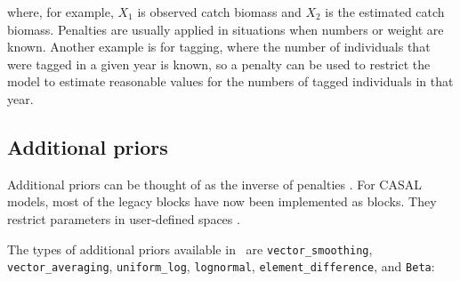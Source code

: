 where, for example, $X_1$ is observed catch biomass and $X_2$ is the estimated catch biomass. Penalties are usually applied in situations when numbers or weight are known. Another example is for tagging, where the number of individuals that were tagged in a given year is known, so a penalty can be used to restrict the model to estimate reasonable values for the numbers of tagged individuals in that year.

\subsection{Additional priors\label{sec:AdditionalPriors}}

Additional priors can be thought of as the inverse of penalties . For CASAL models, most of the legacy  blocks have now been implemented as  blocks. They restrict parameters in user-defined spaces .

The types of additional priors available in \CNAME\ are \texttt{vector\_smoothing}, \texttt{vector\_averaging}, \texttt{uniform\_log}, \texttt{lognormal}, \texttt{element\_difference}, and \texttt{Beta}:

